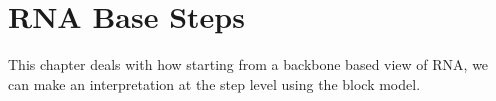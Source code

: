 \chapter{RNA Base Steps}
\label{basesteps} 

This chapter deals with how starting from a backbone based view of
RNA, we can make an interpretation at the step level using the block model.



